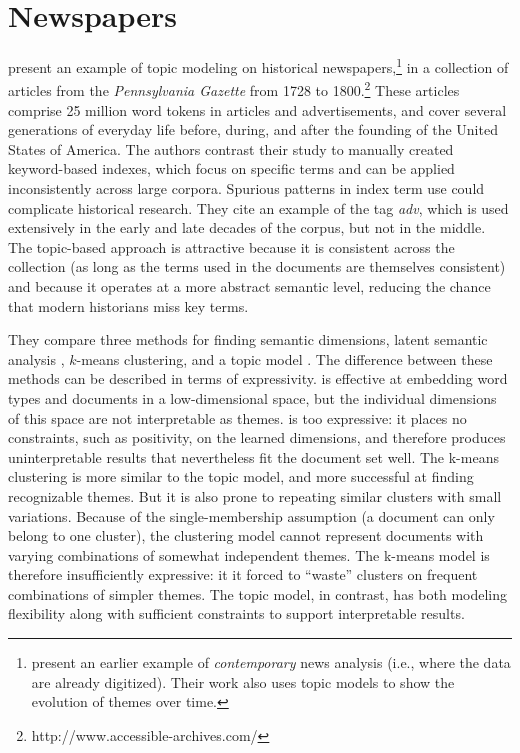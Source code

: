 
\section{Newspapers}

\citet{newman-06} present an example of topic modeling on historical newspapers,\footnote{\citet{mei-05} present an earlier example of \emph{contemporary} news analysis (i.e., where the data are already digitized).  Their work also uses topic models to show the evolution of themes over time.} in a collection of articles from the {\em Pennsylvania Gazette} from 1728 to 1800.\footnote{http://www.accessible-archives.com/}
These articles comprise 25 million word tokens in articles and advertisements, and cover several generations of everyday life before, during, and after the founding of the United States of America.
The authors contrast their study to manually created keyword-based indexes, which focus on specific terms and can be applied inconsistently across large corpora.
Spurious patterns in index term use could complicate historical research.
They cite an example of the tag {\em adv}, which is used extensively in the early and late decades of the corpus, but not in the middle.
The topic-based approach is attractive because it is consistent across the collection (as long as the terms used in the documents are themselves consistent) and because it operates at a more abstract semantic level, reducing the chance that modern historians miss key terms.

They compare three methods for finding semantic dimensions, latent semantic analysis \citep{deerwester-90}, $k$-means clustering, and a topic model \citep{hofmann-99}.
The difference between these methods can be described in terms of expressivity.
 is effective at embedding word types and documents in a low-dimensional space, but the individual dimensions of this space are not interpretable as themes.
 is too expressive: it places no constraints, such as positivity, on the learned dimensions, and therefore produces uninterpretable results that nevertheless fit the document set well.
The k-means clustering is more similar to the topic model, and more successful at finding recognizable themes.
But it is also prone to repeating similar clusters with small variations.
Because of the single-membership assumption (a document can only belong to one cluster), the clustering model cannot represent documents with varying combinations of somewhat independent themes.
The k-means model is therefore insufficiently expressive: it it forced to ``waste'' clusters on frequent combinations of simpler themes.
The topic model, in contrast, has both modeling flexibility along with sufficient  constraints to support interpretable results.

